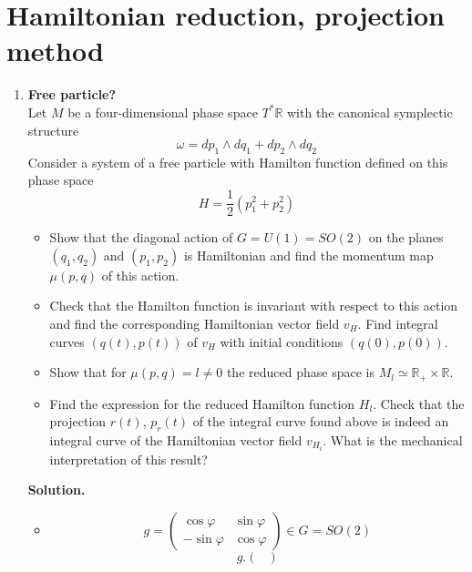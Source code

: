 \documentclass[12pt]{article}
\theoremstyle{definition}
\begin{document}
\section{Hamiltonian reduction, projection method}
\begin{enumerate}
    \item \textbf{Free particle?}\\
    Let $M$ be a four-dimensional phase space $T^*\mathbb{R}$ with the canonical symplectic structure
    \begin{equation}
        \omega=dp_1\wedge dq_1+dp_2\wedge dq_2
    \end{equation}
    Consider a system of a free particle with Hamilton function defined on this phase space
    \begin{equation}
        H=\frac{1}{2}(p_1^2+p_2^2)
    \end{equation}
    \begin{itemize}
        \item Show that the diagonal action of $G = U(1) = SO(2)$ on the planes $(q_1, q_2)$ and $(p_1, p_2)$ is Hamiltonian and find the momentum map $\mu(p, q)$ of this action.
        \item Check that the Hamilton function is invariant with respect to this action and find the corresponding Hamiltonian vector field $v_H$. Find integral curves $(q(t), p(t))$ of $v_H$ with initial conditions $(q(0), p(0))$.
        \item Show that for $\mu(p, q) = l\neq0$ the reduced phase space is $M_l\simeq\mathbb{R}_+\times\mathbb{R}$.
        \item Find the expression for the reduced Hamilton function $H_l$. Check that the projection $r(t)$, $p_r(t)$ of the integral curve found above is indeed an integral curve of the Hamiltonian vector field $v_{H_l}$. What is the mechanical interpretation of this result?
    \end{itemize}
    \textbf{Solution.}
    \begin{itemize}
        \item 
        \begin{equation}
            g=\begin{pmatrix}
                \cos\varphi & \sin\varphi\\
                -\sin\varphi & \cos\varphi
            \end{pmatrix}\in G=SO(2)
        \end{equation}
        \begin{equation}
            g.\begin{pmatrix}

\end{pmatrix}
\end{equation}
\end{itemize}
\end{enumerate}
\end{document}

